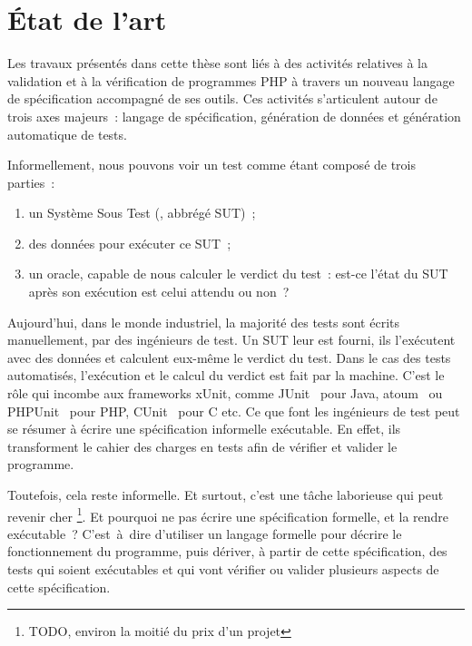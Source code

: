 \chapter{État de l'art}
\label{chapter:state}

\minitoc

Les travaux présentés dans cette thèse sont liés à des activités relatives à la
validation et à la vérification de programmes PHP à travers un nouveau langage
de spécification accompagné de ses outils. Ces activités s'articulent autour de
trois axes majeurs~: langage de spécification, génération de données et
génération automatique de tests.

Informellement, nous pouvons voir un test comme étant composé de trois parties~:

\begin{enumerate}

\item un Système Sous Test (, abbrégé SUT)~;

\item des données pour exécuter ce SUT~;

\item un oracle, capable de nous calculer le verdict du test~: est-ce l'état
du SUT après son exécution est celui attendu ou non~?

\end{enumerate}

Aujourd'hui, dans le monde industriel, la majorité des tests sont écrits
manuellement, par des ingénieurs de test. Un SUT leur est fourni, ils
l'exécutent avec des données et calculent eux-même le verdict du test. Dans le
cas des tests automatisés, l'exécution et le calcul du verdict est fait par la
machine. C'est le rôle qui incombe aux frameworks xUnit, comme
JUnit~ pour Java, atoum~ ou PHPUnit~
pour PHP, CUnit~ pour C etc. Ce que font les ingénieurs de test
peut se résumer à écrire une spécification informelle exécutable. En effet, ils
transforment le cahier des charges en tests afin de vérifier et valider le
programme.

Toutefois, cela reste informelle. Et surtout, c'est une tâche laborieuse qui
peut revenir cher \footnote{TODO, environ la moitié du prix d'un projet}. Et
pourquoi ne pas écrire une spécification formelle, et la rendre exécutable~?
C'est~à~dire d'utiliser un langage formelle pour décrire le fonctionnement du
programme, puis dériver, à partir de cette spécification, des tests qui soient
exécutables et qui vont vérifier ou valider plusieurs aspects de cette
spécification.

